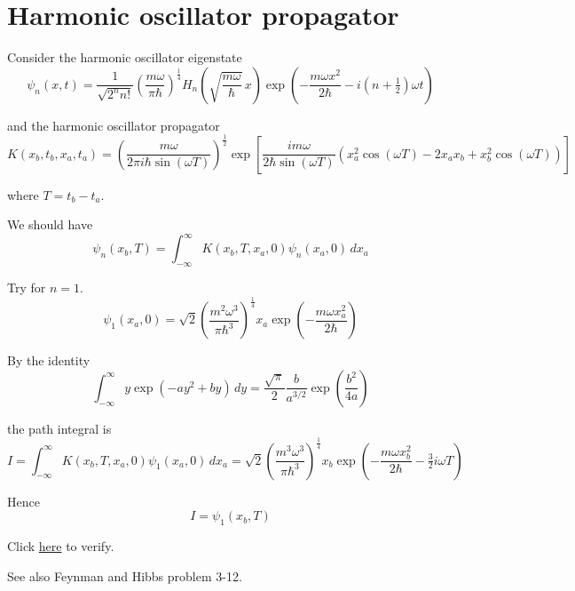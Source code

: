 

\section*{Harmonic oscillator propagator}

Consider the harmonic oscillator eigenstate
\begin{equation*}
\psi_n(x,t)=\frac{1}{\sqrt{2^nn!}}\left(\frac{m\omega}{\pi\hbar}\right)^\frac{1}{4}
H_n\left(\sqrt{\frac{m\omega}{\hbar}}\,x\right)
\exp\left(-\frac{m\omega x^2}{2\hbar}-i\left(n+\tfrac{1}{2}\right)\omega t\right)
\end{equation*}

and the harmonic oscillator propagator
\begin{equation*}
K(x_b,t_b,x_a,t_a)
=\left(\frac{m\omega}{2\pi i\hbar\sin(\omega T)}\right)^\frac{1}{2}
\exp\left[
\frac{im\omega}{2\hbar\sin(\omega T)}
\left(x_a^2\cos(\omega T)-2x_ax_b+x_b^2\cos(\omega T)\right)
\right]
\end{equation*}

where $T=t_b-t_a$.

\bigskip
We should have
\begin{equation*}
\psi_n(x_b,T)=\int_{-\infty}^\infty K(x_b,T,x_a,0)\psi_n(x_a,0)\,dx_a
\end{equation*}

Try for $n=1$.
\begin{equation*}
\psi_1(x_a,0)=\sqrt2\left(\frac{m^2\omega^3}{\pi\hbar^3}\right)^\frac{1}{4}
x_a\exp\left(-\frac{m\omega x_a^2}{2\hbar}\right)
\end{equation*}

By the identity
\begin{equation*}
\int_{-\infty}^\infty y\exp\left(-ay^2+by\right)\,dy
=\frac{\sqrt\pi}{2}\frac{b}{a^{3/2}}\exp\left(\frac{b^2}{4a}\right)
\end{equation*}

the path integral is
\begin{equation*}
I=\int_{-\infty}^\infty K(x_b,T,x_a,0)\psi_1(x_a,0)\,dx_a
=\sqrt2\left(\frac{m^3\omega^3}{\pi\hbar^3}\right)^\frac{1}{4}
x_b\exp\left(-\frac{m\omega x_b^2}{2\hbar}-\tfrac{3}{2}i\omega T\right)
\end{equation*}

Hence
\begin{equation*}
I=\psi_1(x_b,T)
\end{equation*}

Click \href{https://georgeweigt.github.io/blog/110.html}{here} to verify.

\bigskip
See also Feynman and Hibbs problem 3-12.

